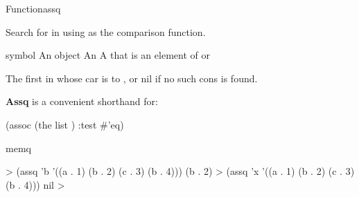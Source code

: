 \documentclass[10pt,twoside,english,pdftex]{article}
\begin{document}
\begin{functiondoc}{Function}{assq}{
    }
%
%
  
\fnsyntax

\fnpurpose Search for  in  using  as the
comparison function.

\fnpackage {}

\fnmodule {}

\fnargs
\begin{args}{symbol}
\arg[item] An object
\arg[alist] An 
\arg[entry] A  that is an element of  or \nil
\end{args}

\fnreturns The first  in  whose car is  to
, or nil if no such cons is found.

\fndescription \textbf{Assq} is a convenient shorthand for:
%
\W\supp
\begin{example}
  (assoc  (the list ) :test #'eq)
\end{example}

\begin{alsos}{memq}
\also[memq]
\end{alsos}

\fnexamples
%
\W\supp
\begin{example}
  > (assq 'b '((a . 1) (b . 2) (c . 3) (b . 4)))
  (b . 2)
  > (assq 'x '((a . 1) (b . 2) (c . 3) (b . 4)))
  nil
  >
\end{example}

\end{functiondoc}

\end{document}
